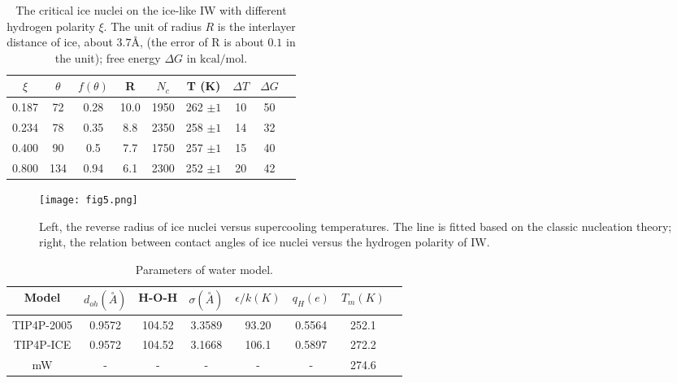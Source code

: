 \documentclass[aps,prl,twocolumn,superscriptaddress]{revtex4-1}
\begin{document}
\begin{table}
\caption{The critical ice nuclei on the ice-like IW with different hydrogen polarity $\xi$. The unit of radius $R$ is the interlayer distance of ice, about $3.7$\AA, (the error of R is about $0.1$ in the unit); free energy $\Delta G$ in $\mathrm{kcal/mol}$.}

\centering{}%
\begin{tabular}{ccccccccc}
\hline
{ $\xi$} & {$\theta$} & { $f\left(\theta\right)$}  & {R}  & {$N_c$} & {T (K)} & {  $\Delta T$}  & {$\Delta G$ }\tabularnewline
\hline
{ 0.187} & { 72} & {0.28}  & {10.0}  & {1950} & {262 $\pm 1$} & {10} & {50}\tabularnewline
{ 0.234} & { 78} & {0.35} & { 8.8}  & {2350} & {258 $\pm 1$} & {14} & {32} \tabularnewline
	{ 0.400} & { 90} & {0.5 }  &{ 7.7} & {1750} & {257 $\pm 1$} & {15} & {40} \tabularnewline
{ 0.800} & {134} & {0.94}  &{ 6.1}  & {2300} & {252 $\pm 1$} & { 20} & {42}\tabularnewline
\hline
\end{tabular}
\label{table:tab1}
\end{table}

\begin{figure}[ht]
  \centering
\texttt{[image: fig5.png]}
\caption{ Left, the reverse radius of ice nuclei versus supercooling temperatures. The line is fitted based on the classic nucleation theory; right, the relation between contact angles of ice nuclei versus the hydrogen polarity of IW. 
\label{fig:fig5} 
}
\end{figure}

\begin{table}
\caption{Parameters of water model.}
\centering{}%
\begin{tabular}{cccccccc}
\hline
{Model} & {$d_{oh}(\overset{\circ}{A})$} & { H-O-H}  & {$\sigma (\overset{\circ}{A})$}  & {$\epsilon/k (K)$} & {$q_H(e)$} & {  $T_m (K)$} 
\tabularnewline
\hline

{ TIP4P-2005} & { 0.9572} & {104.52}  & {3.3589}  & {93.20} & {0.5564} & {252.1} \tabularnewline
{ TIP4P-ICE} & { 0.9572} & {104.52}  & {3.1668}  & {106.1} & {0.5897} & {272.2} \tabularnewline
	{ mW} & { -} & {-}  & {-}  & {-} & {-} & {274.6}  \tabularnewline
\hline
\end{tabular}
\label{table:water model}
\end{table}



\end{document}
